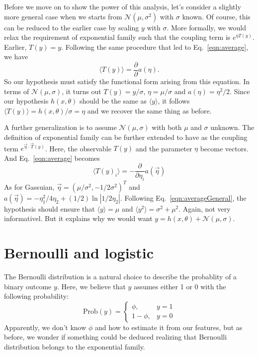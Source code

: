 Before we move on to show the power of this analysis, let's consider a slightly more general case when we starts from $\mathcal N(\mu, \sigma^2)$ with $\sigma$ known. Of course, this can be reduced to the earlier case by scaling $y$ with $\sigma$. More formally, we would relax the requirement of exponential family such that the coupling term is $e^{\eta T(y)}$. Earlier, $T(y) = y$. Following the same procedure that led to Eq.~\ref{eqn:average}, we have
\begin{equation}
	\langle T(y)\rangle = \frac{\partial}{\partial}a(\eta).
\end{equation}
So our hypothesis must satisfy the functional form arising from this equation. In terms of $\mathcal N(\mu, \sigma)$, it turns out $T(y) = y/\sigma$, $\eta = \mu/\sigma$ and $a(\eta) = \eta^2/2$. Since our hypothesis $h(x, \theta)$ should be the same as $\langle y\rangle$, it follows $\langle T(y)\rangle = h(x, \theta)/\sigma = \eta$ and we recover the same thing as before.

A further generalization is to assume $\mathcal N(\mu, \sigma)$ with both $\mu$ and $\sigma$ unknown. The definition of exponential family can be further extended to have as the coupling term $e^{\vec\eta\cdot\vec T(y)}$. Here, the observable $T(y)$ and the parameter $\eta$ become vectors. And Eq.~\ref{eqn:average} becomes
\begin{equation}
	\langle T(y)_i \rangle =-\frac{\partial}{\partial\eta_i}a(\vec\eta)\label{eqn:averageGeneral}
\end{equation}
As for Gassuian, $\vec\eta=(\mu/\sigma^2, -1/2\sigma^2)^T$ and $a(\vec\eta)=-\eta_1^2/4\eta_2+(1/2)\ln\left|1/2\eta_2\right|$. Following Eq.~\ref{eqn:averageGeneral}, the hypothesis should ensure that $\langle y\rangle = \mu$ and $\langle y^2\rangle = \sigma^2 + \mu^2$. Again, not very informativel. But it explains why we would want $y = h(x, \theta) + \mathcal N(\mu, \sigma)$.


\section{Bernoulli and logistic}\label{sec:Bounoulli}
The Bernoulli distribution is a natural choice to describe the probablity of a binary outcome $y$. Here, we believe that $y$ assumes either 1 or 0 with the following probability:
\begin{equation}
	\text{Prob}(y)=\begin{cases}
				\phi, & y = 1\\
				1-\phi, & y = 0
			\end{cases}
\end{equation}
Apparently, we don't know $\phi$ and how to estimate it from our features, but as before, we wonder if something could be deduced realizing that Bernoulli distribution belongs to the exponential family.

